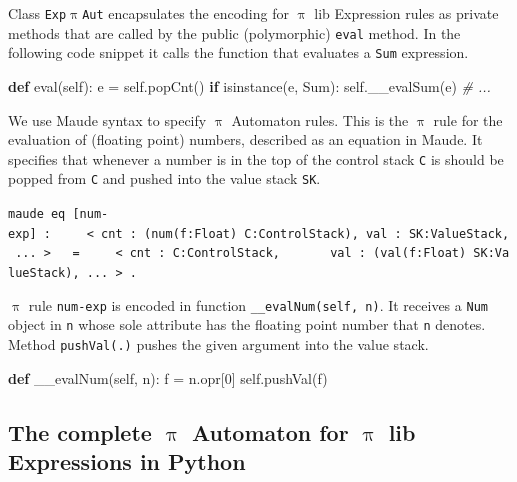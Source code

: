\documentclass[a4paper,openany]{book}
\newenvironment{Shaded}{}{}
\newcommand{\KeywordTok}[1]{\textcolor[rgb]{0.00,0.44,0.13}{\textbf{{#1}}}}
\newcommand{\DecValTok}[1]{\textcolor[rgb]{0.25,0.63,0.44}{{#1}}}
\newcommand{\CommentTok}[1]{\textcolor[rgb]{0.38,0.63,0.69}{\textit{{#1}}}}
\newcommand{\NormalTok}[1]{{#1}}
\newcommand{\VariableTok}[1]{\textcolor[rgb]{0.10,0.09,0.49}{{#1}}}
\newcommand{\ControlFlowTok}[1]{\textcolor[rgb]{0.00,0.44,0.13}{\textbf{{#1}}}}
\newcommand{\OperatorTok}[1]{\textcolor[rgb]{0.40,0.40,0.40}{{#1}}}
\newcommand{\BuiltInTok}[1]{{#1}}
\begin{document}
    Class \texttt{Exp$\uppi$Aut} encapsulates the encoding for $\uppi$ lib Expression
rules as private methods that are called by the public (polymorphic)
\texttt{eval} method. In the following code snippet it calls the
function that evaluates a \texttt{Sum} expression.

\begin{Shaded}
\begin{Highlighting}[]
\KeywordTok{def} \BuiltInTok{eval}\NormalTok{(}\VariableTok{self}\NormalTok{):}
\NormalTok{    e }\OperatorTok{=} \VariableTok{self}\NormalTok{.popCnt()}
    \ControlFlowTok{if} \BuiltInTok{isinstance}\NormalTok{(e, Sum):}
        \VariableTok{self}\NormalTok{.__evalSum(e)  }
\CommentTok{# ...}
\end{Highlighting}
\end{Shaded}

    We use Maude syntax to specify $\uppi$ Automaton rules. This is the $\uppi$ rule for
the evaluation of (floating point) numbers, described as an equation in
Maude. It specifies that whenever a number is in the top of the control
stack \texttt{C} is should be popped from \texttt{C} and pushed into the
value stack \texttt{SK}.

    \texttt{maude\ eq\ {[}num-exp{]}\ :\ \ \ \ \ \textless{}\ cnt\ :\ (num(f:Float)\ C:ControlStack),\ val\ :\ SK:ValueStack,\ ...\ \textgreater{}\ \ \ =\ \ \ \ \ \textless{}\ cnt\ :\ C:ControlStack,\ \ \ \ \ \ \ val\ :\ (val(f:Float)\ SK:ValueStack),\ ...\ \textgreater{}\ .}

    $\uppi$ rule \texttt{num-exp} is encoded in function
\texttt{\_\_evalNum(self,\ n)}. It receives a \texttt{Num} object in
\texttt{n} whose sole attribute has the floating point number that
\texttt{n} denotes. Method \texttt{pushVal(.)} pushes the given argument
into the value stack.

\begin{Shaded}
\begin{Highlighting}[]
\KeywordTok{def}\NormalTok{ __evalNum(}\VariableTok{self}\NormalTok{, n):}
\NormalTok{    f }\OperatorTok{=}\NormalTok{ n.opr[}\DecValTok{0}\NormalTok{]}
    \VariableTok{self}\NormalTok{.pushVal(f)}
\end{Highlighting}
\end{Shaded}

    \subsection{The complete $\uppi$ Automaton for $\uppi$ lib Expressions in
Python}\label{the-complete-ux3c0-automaton-for-ux3c0-lib-expressions-in-python}
\end{document}
